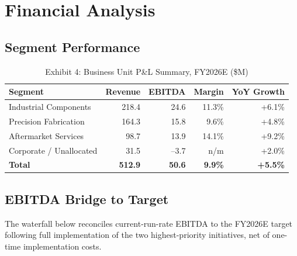 \section{Financial Analysis}

\subsection{Segment Performance}

\begin{table}[htbp]
\centering
\small
\begin{tabular}{@{}lrrrr@{}}
\toprule
\textbf{Segment} & \textbf{Revenue} & \textbf{EBITDA} & \textbf{Margin} & \textbf{YoY Growth} \\
\midrule
Industrial Components     & 218.4 & 24.6 & 11.3\% & +6.1\% \\
Precision Fabrication     & 164.3 & 15.8 & 9.6\%  & +4.8\% \\
Aftermarket Services      & 98.7  & 13.9 & 14.1\% & +9.2\% \\
Corporate / Unallocated   & 31.5  & --3.7 & n/m   & +2.0\% \\
\midrule
\rowcolor{lightgrey}
\textbf{Total}             & \textbf{512.9} & \textbf{50.6} & \textbf{9.9\%} & \textbf{+5.5\%} \\
\bottomrule
\end{tabular}
\caption{Exhibit 4: Business Unit P\&L Summary, FY2026E (\$M)}
\end{table}

\subsection{EBITDA Bridge to Target}

The waterfall below reconciles current-run-rate EBITDA to the FY2026E target following full implementation of the two highest-priority initiatives, net of one-time implementation costs.

